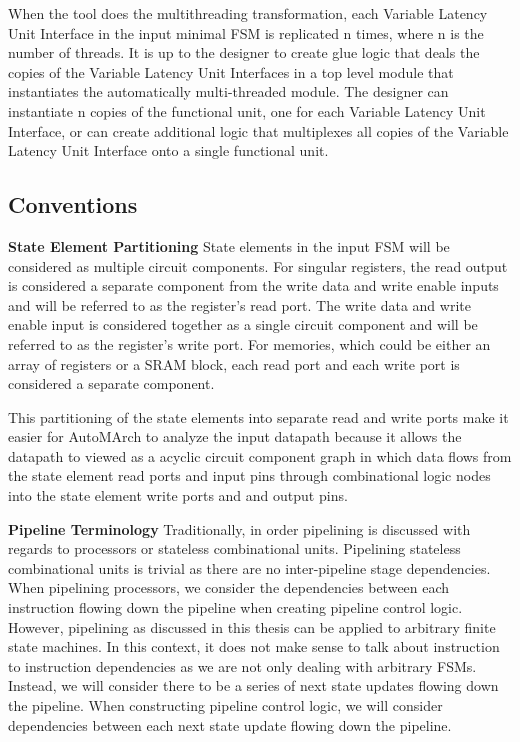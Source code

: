 When the tool does the multithreading transformation, each Variable Latency Unit Interface in the input minimal FSM is replicated n times, where n is the number of threads. It is up to the designer to create glue logic that deals the copies of the Variable Latency Unit Interfaces in a top level module that instantiates the automatically multi-threaded module. The designer can instantiate n copies of the functional unit, one for each Variable Latency Unit Interface, or can create additional logic that multiplexes all copies of the Variable Latency Unit Interface onto a single functional unit.

\subsection{Conventions}
\label{section:conventions}
{\bf State Element Partitioning}
State elements in the input FSM will be considered as multiple circuit components. For singular registers, the read output is considered a separate component from the write data and write enable inputs and will be referred to as the register's read port. The write data and write enable input is considered together as a single circuit component and will be referred to as the register's write port. For memories, which could be either an array of registers or a SRAM block, each read port and each write port is considered a separate component. 

This partitioning of the state elements into separate read and write ports make it easier for AutoMArch to analyze the input datapath because it allows the datapath to viewed as a acyclic circuit component graph in which data flows from the state element read ports and input pins through combinational logic nodes into the state element write ports and and output pins.

{\bf Pipeline Terminology}
Traditionally, in order pipelining is discussed with regards to processors or stateless combinational units. Pipelining stateless combinational units is trivial as there are no inter-pipeline stage dependencies. When pipelining processors, we consider the dependencies between each instruction flowing down the pipeline when creating pipeline control logic. However, pipelining as discussed in this thesis can be applied to arbitrary finite state machines. In this context, it does not make sense to talk about instruction to instruction dependencies as we are not only dealing with arbitrary FSMs. Instead, we will consider there to be a series of next state updates flowing down the pipeline. When constructing pipeline control logic, we will consider dependencies between each next state update flowing down the pipeline.

